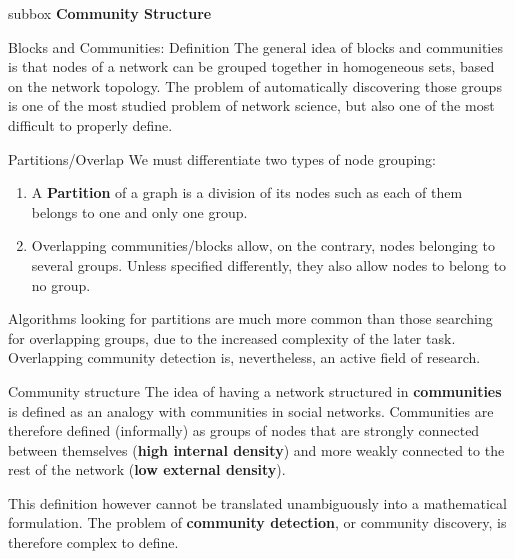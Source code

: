 \documentclass[a4paper,11pt]{book}
\begin{document}

\newpage



\begin{subbox}{subbox}{}
\centering
\Large{\textbf{Community Structure}}
\end{subbox}




\begin{textbox}{Blocks and Communities: Definition}
The general idea of blocks and communities is that nodes of a network can be grouped together in homogeneous sets, based on the network topology. The problem of automatically discovering those groups is one of the most studied problem of network science, but also one of the most difficult to properly define.

\end{textbox}



\begin{textbox}{Partitions/Overlap}
We must differentiate two types of node grouping: 
\begin{enumerate}
    \item A \textbf{Partition} of a graph is a division of its nodes such as each of them belongs to one and only one group.
    \item Overlapping communities/blocks allow, on the contrary, nodes belonging to several groups. Unless specified differently, they also allow nodes to belong to no group.
\end{enumerate}
Algorithms looking for partitions are much more common than those searching for overlapping groups, due to the increased complexity of the later task. Overlapping community detection is, nevertheless, an active field of research.
\end{textbox}


\begin{textbox}{Community structure}
The idea of having a network structured in \textbf{communities} is defined as an analogy with communities in social networks. Communities are therefore defined (informally) as groups of nodes that are strongly connected between themselves (\textbf{high internal density}) and more weakly connected to the rest of the network (\textbf{low external density}).

This definition however cannot be translated unambiguously into a mathematical formulation. The problem of \textbf{community detection}, or community discovery, is therefore complex to define.
\end{textbox}
\end{document}
